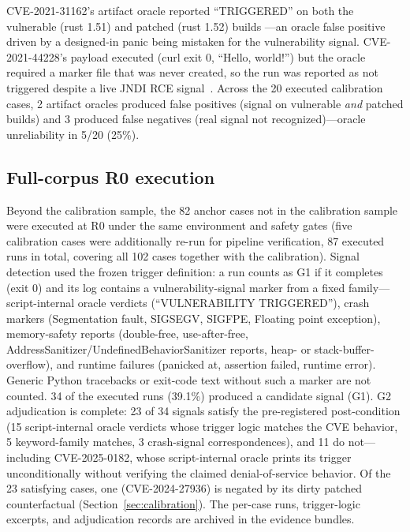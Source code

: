 \documentclass[11pt]{article}
\begin{document}
CVE-2021-31162's artifact oracle reported ``TRIGGERED'' on both the vulnerable (rust 1.51) and patched (rust 1.52) builds ---an oracle false positive driven by a designed-in panic being mistaken for the vulnerability signal. CVE-2021-44228's payload executed (curl exit 0, ``Hello, world!'') but the oracle required a marker file that was never created, so the run was reported as not triggered despite a live JNDI RCE signal~\citep{nvd202144228}. Across the 20 executed calibration cases, 2 artifact oracles produced false positives (signal on vulnerable \emph{and} patched builds) and 3 produced false negatives (real signal not recognized)---oracle unreliability in 5/20 (25\%).

\subsection{Full-corpus R0 execution}
Beyond the calibration sample, the 82 anchor cases not in the calibration sample were executed at R0 under the same environment and safety gates (five calibration cases were additionally re-run for pipeline verification, 87 executed runs in total, covering all 102 cases together with the calibration). Signal detection used the frozen trigger definition: a run counts as G1 if it completes (exit 0) and its log contains a vulnerability-signal marker from a fixed family---script-internal oracle verdicts (``VULNERABILITY TRIGGERED''), crash markers (Segmentation fault, SIGSEGV, SIGFPE, Floating point exception), memory-safety reports (double-free, use-after-free, AddressSanitizer/UndefinedBehaviorSanitizer reports, heap- or stack-buffer-overflow), and runtime failures (panicked at, assertion failed, runtime error). Generic Python tracebacks or exit-code text without such a marker are not counted. 34 of the executed runs (39.1\%) produced a candidate signal (G1). G2 adjudication is complete: 23 of 34 signals satisfy the pre-registered post-condition (15 script-internal oracle verdicts whose trigger logic matches the CVE behavior, 5 keyword-family matches, 3 crash-signal correspondences), and 11 do not---including CVE-2025-0182, whose script-internal oracle prints its trigger unconditionally without verifying the claimed denial-of-service behavior. Of the 23 satisfying cases, one (CVE-2024-27936) is negated by its dirty patched counterfactual (Section~\ref{sec:calibration}). The per-case runs, trigger-logic excerpts, and adjudication records are archived in the evidence bundles.
\end{document}
